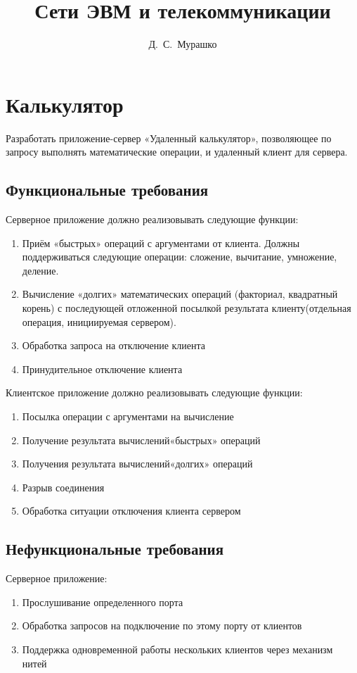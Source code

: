 \documentclass[12pt,a4paper]{report}
\author{Д.~С.~Мурашко}
\title{Сети ЭВМ и телекоммуникации}
\begin{document}
\maketitle
\chapter{Калькулятор}
Разработать  приложение-сервер «Удаленный  калькулятор», 
позволяющее  по  запросу  выполнять  математические  операции,  и  удаленный клиент для сервера. 
\section{Функциональные требования}
Серверное приложение должно реализовывать следующие функции:
\begin{enumerate}
\item{Приём «быстрых» операций с аргументами от клиента. Должны поддерживаться  следующие  операции:  сложение,  вычитание,  умножение, деление. }
\item{Вычисление «долгих»  математических  операций (факториал,  квадратный  корень)  с  последующей  отложенной  посылкой  результата
клиенту(отдельная операция, инициируемая сервером).}
\item{Обработка запроса на отключение клиента}
\item{Принудительное отключение клиента}
\end{enumerate}

Клиентское приложение должно реализовывать следующие функции:
\begin{enumerate}
\item{Посылка операции с аргументами на вычисление}
\item{Получение результата вычислений«быстрых» операций}
\item{Получения результата вычислений«долгих» операций}
\item{Разрыв соединения}
\item{Обработка ситуации отключения клиента сервером}
\end{enumerate}

\section{Нефункциональные требования}
Серверное приложение:
\begin{enumerate}
\item{Прослушивание определенного порта}
\item{Обработка запросов на подключение по этому порту от клиентов}
\item{Поддержка одновременной работы нескольких клиентов через механизм нитей}
\end{enumerate}
\end{document}
